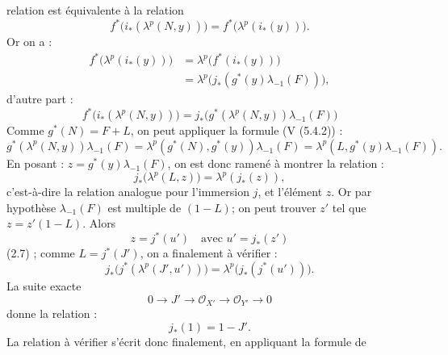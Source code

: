 relation est équivalente à la relation
\[
  f^*\bigl(i_*(\lambda^p(N,y))\bigr)=
  f^*\bigl(\lambda^p(i_*(y))\bigr).
\]
Or on a :
\[
\begin{aligned}
 f^*\bigl(\lambda^p(i_*(y))\bigr)
 &=\lambda^p\bigl(f^*(i_*(y))\bigr)\\
 &=\lambda^p\bigl(j_*(g^*(y)\lambda_{-1}(F))\bigr),
\end{aligned}
\tag{3.4}
\]
d'autre part :
\[
  f^*\bigl(i_*(\lambda^p(N,y))\bigr)
  =
  j_*\bigl(g^*(\lambda^p(N,y))\lambda_{-1}(F)\bigr)
  \tag{3.4}
\]
Comme \(g^*(N)=F+L\), on peut appliquer la formule (V (5.4.2)) :
\[
  g^*(\lambda^p(N,y))\lambda_{-1}(F)
  =
  \lambda^p(g^*(N),g^*(y))\lambda_{-1}(F)
  =
  \lambda^p(L,g^*(y)\lambda_{-1}(F)).
\]
En posant : \(z=g^*(y)\lambda_{-1}(F)\), on est donc ramené à montrer la relation :
\[
  j_*\bigl(\lambda^p(L,z)\bigr)=\lambda^p(j_*(z)),
\]
c'est-à-dire la relation analogue pour l'immersion \(j\), et l'élément \(z\). Or par hypothèse \(\lambda_{-1}(F)\) est multiple de \((1-L)\); on peut trouver \(z'\) tel que \(z=z'(1-L)\). Alors
\[
  z=j^*(u')\quad\text{avec }u'=j_*(z')
\]
(2.7) ; comme \(L=j^*(J')\), on a finalement à vérifier :
\[
  j_*\bigl(j^*(\lambda^p(J',u'))\bigr)=
  \lambda^p\bigl(j_*(j^*(u'))\bigr).
\]
La suite exacte
\[
  0\longrightarrow J'\longrightarrow \mathcal O_{X'}
  \longrightarrow \mathcal O_{Y'}\longrightarrow 0
\]
donne la relation :
\begin{equation}\tag{4.3.2}
  j_*(1)=1-J'.
\end{equation}
La relation à vérifier s'écrit donc finalement, en appliquant la formule de
